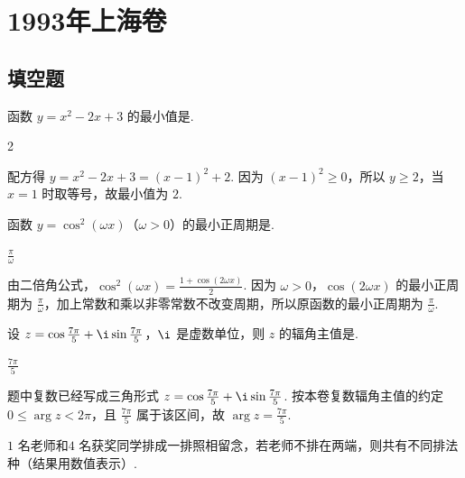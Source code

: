 \chapter{1993年上海卷}
\section{填空题}

\begin{problem}
函数 \(y = x^2 - 2x + 3\) 的最小值是\fillinblank{}.
\end{problem}

\begin{answer}
2
\end{answer}

\begin{solution}
配方得 \(y=x^2-2x+3=(x-1)^2+2\). 因为 \((x-1)^2\geqslant 0\)，所以 \(y\geqslant 2\)，当 \(x=1\) 时取等号，故最小值为 \(2\).
\end{solution}

\begin{problem}
函数 \(y = \cos^2(\omega x)\)（\(\omega > 0\)）的最小正周期是\fillinblank{}.
\end{problem}

\begin{answer}
\(\frac{\pi}{\omega}\)
\end{answer}

\begin{solution}
由二倍角公式，\(\cos^2(\omega x)=\frac{1+\cos(2\omega x)}{2}\). 因为 \(\omega>0\)，\(\cos(2\omega x)\) 的最小正周期为 \(\frac{\pi}{\omega}\)，加上常数和乘以非零常数不改变周期，所以原函数的最小正周期为 \(\frac{\pi}{\omega}\).
\end{solution}

\begin{problem}
设 \(z = \cos \frac{7\pi}{5} + \i \sin \frac{7\pi}{5}\)，\(\i\) 是虚数单位，则 \(z\) 的辐角主值是\fillinblank{}.
\end{problem}

\begin{answer}
\(\frac{7\pi}{5}\)
\end{answer}

\begin{solution}
题中复数已经写成三角形式 \(z=\cos\frac{7\pi}{5}+\i\sin\frac{7\pi}{5}\). 按本卷复数辐角主值的约定 \(0\leqslant\arg z<2\pi\)，且 \(\frac{7\pi}{5}\) 属于该区间，故 \(\arg z=\frac{7\pi}{5}\).
\end{solution}

\begin{problem}
\(1\text{ 名}\)老师和\(4\text{ 名}\)获奖同学排成一排照相留念，若老师不排在两端，则共有不同排法\fillinblank{}\(\text{种}\)（结果用数值表示）.
\end{problem}

